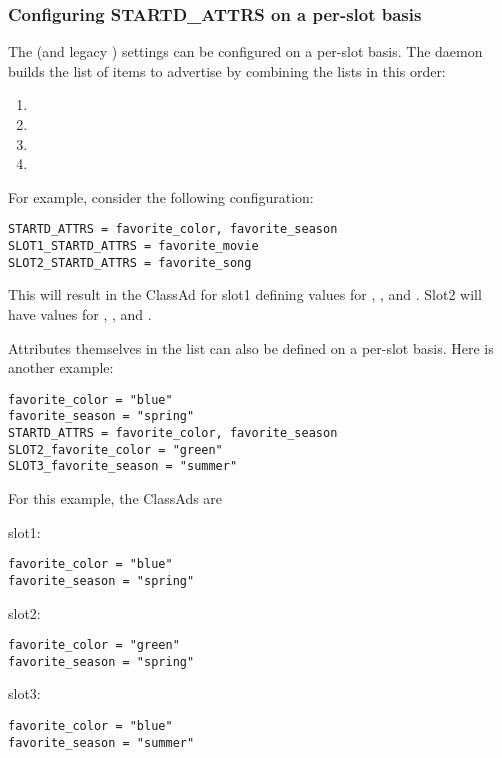 \subsubsection{\label{sec:SMP-exprs}
Configuring STARTD\_ATTRS on a per-slot basis}

The  (and legacy ) settings
can be configured on a per-slot basis.
The  daemon builds the list of items to
advertise by combining the lists in this order:
\begin{enumerate}
\item{}
\item{}
\item{}
\item{}
\end{enumerate}

For example, consider the following configuration:
\begin{verbatim}
STARTD_ATTRS = favorite_color, favorite_season
SLOT1_STARTD_ATTRS = favorite_movie
SLOT2_STARTD_ATTRS = favorite_song
\end{verbatim}

This will result in the  ClassAd for
slot1 defining values for
, ,
and .
Slot2 will have values for
, , and .

Attributes themselves in the  list
can also be defined on a per-slot basis.
Here is another example:

\begin{verbatim}
favorite_color = "blue"
favorite_season = "spring"
STARTD_ATTRS = favorite_color, favorite_season
SLOT2_favorite_color = "green"
SLOT3_favorite_season = "summer"
\end{verbatim}

For this example, the  ClassAds are
\begin{description}
\item{slot1}:
\begin{verbatim}
favorite_color = "blue"
favorite_season = "spring"
\end{verbatim}
\item{slot2}:
\begin{verbatim}
favorite_color = "green"
favorite_season = "spring"
\end{verbatim}
\item{slot3}:
\begin{verbatim}
favorite_color = "blue"
favorite_season = "summer"
\end{verbatim}
\end{description}

